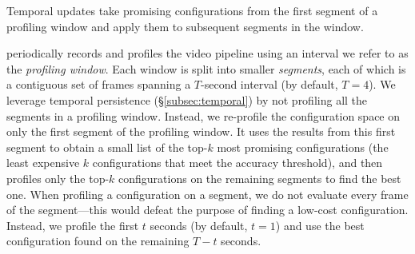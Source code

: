  

\begin{algorithm}[t!]
	\DontPrintSemicolon
	\caption{Temporal updates take promising configurations from the first segment of a profiling window and apply them to subsequent segments in the window.}
	\label{alg:temporal}
\end{algorithm}

{\name} periodically records and profiles the video pipeline using an interval we refer to as the {\em profiling window}. 
Each window is split into smaller {\em segments}, each of which is a contiguous set of frames spanning a $T$-second interval (by default, $T = 4$). We leverage temporal persistence (\S\ref{subsec:temporal}) by not profiling all the segments in a profiling window. Instead, we re-profile the configuration space on only the first segment of the profiling window. It uses the results from this first segment to obtain a small list of the top-$k$ most promising configurations (\ie the least expensive $k$ configurations that meet the accuracy threshold), and then profiles only the top-$k$ configurations on the remaining segments to find the best one. When profiling a configuration on a segment, we do not evaluate every frame of the segment---this would defeat the purpose of finding a low-cost configuration. Instead, we profile the first $t$ seconds (by default, $t = 1$) and use the best configuration found on the remaining $T-t$ seconds. 

